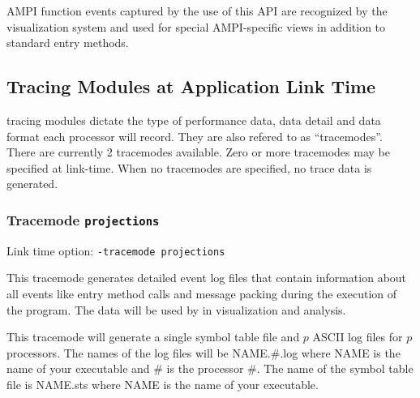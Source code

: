 \documentclass[10pt]{article}
\begin{document}
AMPI function events captured by the use of this API are recognized by
the visualization system and used for special AMPI-specific views in
addition to standard \charmpp{} entry methods.

%
%

\subsection{\projections{} Tracing Modules at Application Link Time}
\label{sec::trace modules}

\projections{} tracing modules dictate the type of performance data,
data detail and data format each processor will record. They are also
refered to as ``tracemodes''. There are currently 2 tracemodes
available. Zero or more tracemodes may be specified at link-time. When
no tracemodes are specified, no trace data is generated.

\subsubsection{Tracemode {\tt projections}}

Link time option: {\tt -tracemode projections}

This tracemode generates detailed event log files that contain
information about all \charmpp{} events like entry method calls and
message packing during the execution of the program.  The data will be
used by \projections{} in visualization and analysis.

This tracemode will generate a single symbol table file and $p$ ASCII
log files for $p$ processors. The names of the log files will be
NAME.\#.log where NAME is the name of your executable and \# is the
processor \#. The name of the symbol table file is NAME.sts where NAME
is the name of your executable.
\end{document}
